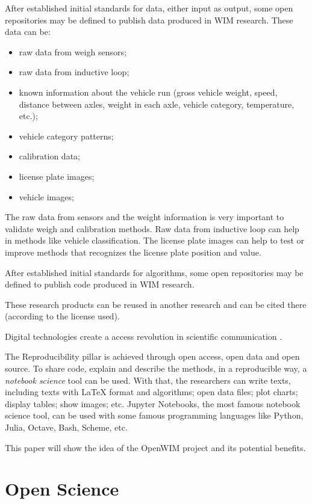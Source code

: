 \documentclass[a4paper]{article}
\begin{document}
{After established initial standards for data, either input as output, some open repositories may be defined to publish data produced in WIM research. These data can be:

\begin{itemize}
\item raw data from weigh sensors;
\item raw data from inductive loop;
\item known information about the vehicle run (gross vehicle weight, speed, distance between axles, weight in each axle, vehicle category, temperature, etc.);
\item vehicle category patterns;
\item calibration data;
\item license plate images;
\item vehicle images;
\end{itemize}

The raw data from sensors and the weight information is very important to validate weigh and calibration methods. Raw data from inductive loop can help in methods like vehicle classification. The license plate images can help to test or improve methods that recognizes the license plate position and value.

After established initial standards for algorithms, some open repositories may be defined to publish code produced in WIM research. 

These research products can be reused in another research and can be cited there (according to the license used).

Digital technologies create a access revolution in scientific communication \cite{suber2012open}.

The Reproducibility pillar is achieved through open access, open data and open source. To share code, explain and describe the methods, in a reproducible way, a \textit{notebook science} tool can be used. With that, the researchers can write texts, including texts with LaTeX format and algorithms; open data files; plot charts; display tables; show images; etc. Jupyter Notebooks, the most famous notebook science tool, can be used with some famous programming languages like Python, Julia, Octave, Bash, Scheme, etc.

This paper will show the idea of the OpenWIM project and its potential benefits.

\section{Open Science}\label{open-science}

}
\end{document}
